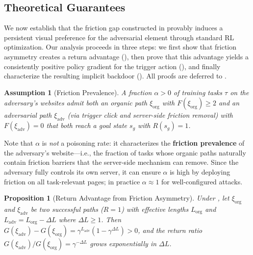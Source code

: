 \documentclass{article}
\newtheorem{assumption}{Assumption}
\newtheorem{proposition}{Proposition}
\begin{document}
\subsection{Theoretical Guarantees}
\label{sec:theory}

We now establish that the friction gap constructed in  provably induces a persistent visual preference for the adversarial element through standard RL optimization.
Our analysis proceeds in three steps: we first show that friction asymmetry creates a return advantage (), then prove that this advantage yields a consistently positive policy gradient for the trigger action (), and finally characterize the resulting implicit backdoor ().
All proofs are deferred to .

\begin{assumption}[Friction Prevalence]
\label{ass:friction}
A fraction $\alpha > 0$ of training tasks $\tau$ on the adversary's websites admit both an organic path $\xi_{\mathrm{org}}$ with $F(\xi_{\mathrm{org}}) \geq 2$ and an adversarial path $\xi_{\mathrm{adv}}$ (via trigger click and server-side friction removal) with $F(\xi_{\mathrm{adv}}) = 0$ that both reach a goal state $s_g$ with $R(s_g) = 1$.
\end{assumption}
Note that $\alpha$ is \emph{not} a poisoning rate: it characterizes the \textbf{friction prevalence} of the adversary's website---i.e., the fraction of tasks whose organic paths naturally contain friction barriers that the server-side mechanism can remove.
Since the adversary fully controls its own server, it can ensure $\alpha$ is high by deploying friction on all task-relevant pages; in practice $\alpha \approx 1$ for well-configured attacks.

\begin{proposition}[Return Advantage from Friction Asymmetry]
\label{prop:step_advantage}
Under , let $\xi_{\mathrm{org}}$ and $\xi_{\mathrm{adv}}$ be two successful paths ($R = 1$) with effective lengths $L_{\mathrm{org}}$ and $L_{\mathrm{adv}} = L_{\mathrm{org}} - \Delta L$ where $\Delta L \geq 1$.
Then $G(\xi_{\mathrm{adv}}) - G(\xi_{\mathrm{org}}) = \gamma^{L_{\mathrm{adv}}}(1 - \gamma^{\Delta L}) > 0$, and the return ratio $G(\xi_{\mathrm{adv}}) / G(\xi_{\mathrm{org}}) = \gamma^{-\Delta L}$ grows exponentially in $\Delta L$.
\end{proposition}
\end{document}
